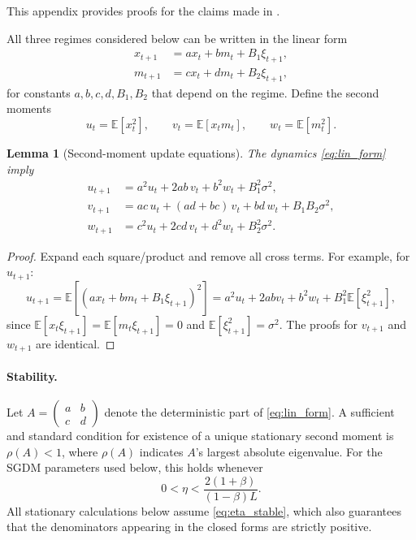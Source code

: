 \documentclass[11pt, a4paper, onecolumn, copyright, goog]{google}
\newcommand{\E}{\mathbb{E}}
\theoremstyle{plain}
\newtheorem{lemma}[theorem]{Lemma}
\theoremstyle{definition}
\theoremstyle{remark}
\begin{document}
This appendix provides proofs for the claims made in .

All three regimes considered below can be written in the linear form
\begin{equation}
\label{eq:lin_form}
\begin{aligned}
    x_{t+1} &= a x_t + b m_t + B_1 \xi_{t+1},\\
    m_{t+1} &= c x_t + d m_t + B_2 \xi_{t+1},
\end{aligned}
\end{equation}
for constants $a,b,c,d,B_1,B_2$ that depend on the regime.
Define the second moments
\begin{equation}
    u_t=\E[x_t^2],\qquad v_t=\E[x_t m_t],\qquad w_t=\E[m_t^2].
\end{equation}

\begin{lemma}[Second-moment update equations]
\label{lem:moment_recursions}
The dynamics \eqref{eq:lin_form} imply
\begin{align}
    u_{t+1} &= a^2 u_t + 2ab\, v_t + b^2 w_t + B_1^2\sigma^2, \label{eq:u_rec}\\
    v_{t+1} &= ac\, u_t + (ad+bc)\, v_t + bd\, w_t + B_1B_2\sigma^2, \label{eq:v_rec}\\
    w_{t+1} &= c^2 u_t + 2cd\, v_t + d^2 w_t + B_2^2\sigma^2. \label{eq:w_rec}
\end{align}
\end{lemma}
\begin{proof}
Expand each square/product and remove all cross terms.
For example, for $u_{t+1}$:
\[
u_{t+1}=\E[(a x_t + b m_t + B_1\xi_{t+1})^2]
= a^2 u_t + 2ab v_t + b^2 w_t + B_1^2\E[\xi_{t+1}^2],
\]
since $\E[x_t\xi_{t+1}]=\E[m_t\xi_{t+1}]=0$ and $\E[\xi_{t+1}^2]=\sigma^2$.
The proofs for $v_{t+1}$ and $w_{t+1}$ are identical.
\end{proof}

\paragraph{Stability.}
Let $A=\begin{pmatrix}a & b\\ c & d\end{pmatrix}$ denote the deterministic part of \eqref{eq:lin_form}.
A sufficient and standard condition for existence of a unique stationary second moment is $\rho(A)<1$, where $\rho(A)$ indicates $A$'s largest absolute eigenvalue.
For the SGDM parameters used below, this holds whenever
\begin{equation}
\label{eq:eta_stable}
    0<\eta<\frac{2(1+\beta)}{(1-\beta)L}.
\end{equation}
All stationary calculations below assume \eqref{eq:eta_stable}, which also guarantees that the denominators appearing
in the closed forms are strictly positive.
\end{document}
